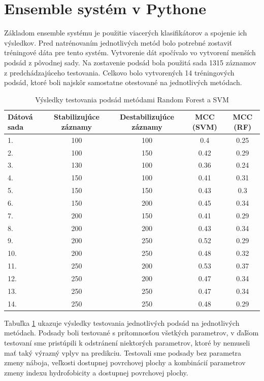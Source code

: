 \section{Ensemble systém v Pythone}

Základom ensemble systému je použitie viacerých klasifikátorov a spojenie ich výsledkov. Pred natrénovaním jednotlivých metód bolo potrebné zostaviť tréningové dáta pre tento systém. Vytvorenie dát spočívalo vo vytvorení menších podsád z pôvodnej sady. Na zostavenie podsád bola použitá sada 1315 záznamov z predchádzajúceho testovania. Celkovo bolo vytvorených 14 tréningových podsád, ktoré boli najskôr samostatne otestované na jednotlivých metódach. 
  
\begin{table}[H]
	\centering
	\begin{tabular}{ |l | c | c | c | c|}
		\hline 
		Dátová sada & Stabilizujúce záznamy & Destabilizujúce záznamy & MCC (SVM) & MCC (RF)  \\ \hline
	1. & 100 & 100 & 0.4 & 0.25\\ \hline
	2. & 100 & 150 & 0.42 & 0.29\\ \hline
	3. & 130 & 100 & 0.36 & 0.24\\ \hline
	4. & 150 & 100 & 0.41 & 0.31\\ \hline
	5. & 150 & 150 & 0.43 & 0.3\\ \hline
	6. & 150 & 200 & 0.45 & 0.34\\ \hline
	7. & 200 & 150 & 0.41 & 0.29\\ \hline
	8. & 200 & 200 & 0.43 & 0.34\\ \hline
	9. & 200 & 250 & 0.52 & 0.29\\ \hline
	10. & 200 & 250 & 0.48 & 0.32\\ \hline
	11. & 250 & 200 & 0.53 & 0.37\\ \hline
	12. & 250 & 200 & 0.47 & 0.34\\ \hline
	13. & 250 & 250 & 0.47 & 0.34\\ \hline
	14. & 250 & 250 & 0.48 & 0.29\\ \hline
	\end{tabular}
	\caption {Výsledky testovania podsád metódami Random Forest a SVM} \label{pythontest} 
\end{table}

Tabuľka \ref{pythontest} ukazuje výsledky testovania jednotlivých podsád na jednotlivých metódach. Podsady boli testované s prítomnosťou všetkých parametrov, v ďaľšom testovaní sme pristúpili k odstránení niektorých parametrov, ktoré by nemuseli mať taký výrazný vplyv na predikciu. Testovali sme podsady bez parametra zmeny náboja, veľkosti dostupnej povrchovej plochy a kombinácií parametrov zmeny indexu hydrofobicity a dostupnej povrchovej plochy.

